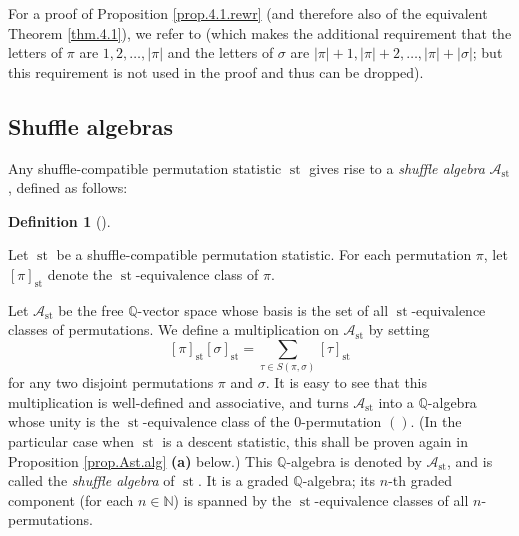 \documentclass[numbers=enddot,12pt,final,onecolumn,notitlepage]{scrartcl}%
\theoremstyle{definition}
\newtheorem{defi}[theo]{Definition}
\newenvironment{definition}[1][]
{\begin{defi}[#1]\begin{leftbar}}
{\end{leftbar}\end{defi}}
\newenvironment{verlong}{}{}
\let\sumnonlimits\sum
\renewcommand{\sum}{\sumnonlimits\limits}
\begin{document}
\begin{verlong}
For a proof of Proposition \ref{prop.4.1.rewr} (and therefore also of the
equivalent Theorem \ref{thm.4.1}), we refer to \cite[(5.2.6)]{HopfComb} (which
makes the additional requirement that the letters of $\pi$ are $1,2,\ldots
,\left\vert \pi\right\vert $ and the letters of $\sigma$ are $\left\vert
\pi\right\vert +1,\left\vert \pi\right\vert +2,\ldots,\left\vert
\pi\right\vert +\left\vert \sigma\right\vert $; but this requirement is not
used in the proof and thus can be dropped).
\end{verlong}

\subsection{Shuffle algebras}

Any shuffle-compatible permutation statistic $\operatorname{st}$ gives rise
to a \textit{shuffle algebra} $\mathcal{A}_{\operatorname{st}}$, defined as follows:

\begin{definition}
\label{def.Ast}Let $\operatorname{st}$ be a shuffle-compatible permutation
statistic. For each permutation $\pi$, let $\left[  \pi\right]
_{\operatorname{st}}$ denote the $\operatorname{st}$-equivalence class of
$\pi$.

Let $\mathcal{A}_{\operatorname{st}}$ be the free $\mathbb{Q}$-vector space
whose basis is the set of all $\operatorname{st}$-equivalence classes of
permutations. We define a multiplication on $\mathcal{A}_{\operatorname{st}}$
by setting%
\[
\left[  \pi\right]  _{\operatorname{st}}\left[  \sigma\right]
_{\operatorname{st}}=\sum_{\tau\in S\left(  \pi,\sigma\right)  }\left[
\tau\right]  _{\operatorname{st}}%
\]
for any two disjoint permutations $\pi$ and $\sigma$. It is easy to see that
this multiplication is well-defined and associative, and turns $\mathcal{A}%
_{\operatorname{st}}$ into a $\mathbb{Q}$-algebra whose unity is the
$\operatorname{st}$-equivalence class of the $0$-permutation
$\left( \right)$.
\begin{verlong}
(In the
particular case when $\operatorname{st}$ is a descent statistic, this shall
be proven again in Proposition \ref{prop.Ast.alg} \textbf{(a)} below.)
\end{verlong}
This
$\mathbb{Q}$-algebra is denoted by $\mathcal{A}_{\operatorname{st}}$, and is
called the \textit{shuffle algebra} of $\operatorname{st}$. It is a graded
$\mathbb{Q}$-algebra; its $n$-th graded component (for each $n\in\mathbb{N}$)
is spanned by the $\operatorname{st}$-equivalence classes of all $n$-permutations.
\end{definition}
\end{document}
